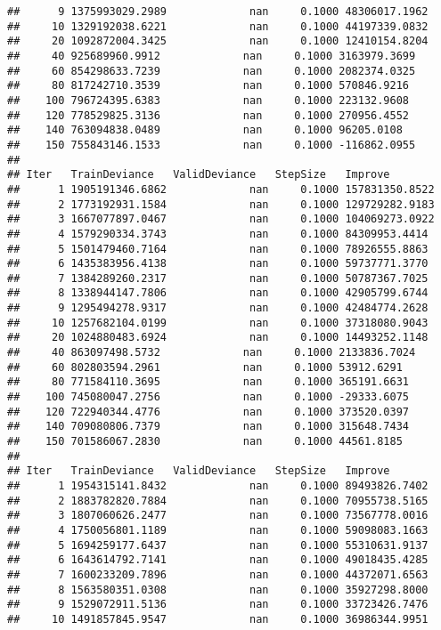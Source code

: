 \documentclass[
]{article}
\begin{document}
\begin{verbatim}
##      9 1375993029.2989             nan     0.1000 48306017.1962
##     10 1329192038.6221             nan     0.1000 44197339.0832
##     20 1092872004.3425             nan     0.1000 12410154.8204
##     40 925689960.9912             nan     0.1000 3163979.3699
##     60 854298633.7239             nan     0.1000 2082374.0325
##     80 817242710.3539             nan     0.1000 570846.9216
##    100 796724395.6383             nan     0.1000 223132.9608
##    120 778529825.3136             nan     0.1000 270956.4552
##    140 763094838.0489             nan     0.1000 96205.0108
##    150 755843146.1533             nan     0.1000 -116862.0955
## 
## Iter   TrainDeviance   ValidDeviance   StepSize   Improve
##      1 1905191346.6862             nan     0.1000 157831350.8522
##      2 1773192931.1584             nan     0.1000 129729282.9183
##      3 1667077897.0467             nan     0.1000 104069273.0922
##      4 1579290334.3743             nan     0.1000 84309953.4414
##      5 1501479460.7164             nan     0.1000 78926555.8863
##      6 1435383956.4138             nan     0.1000 59737771.3770
##      7 1384289260.2317             nan     0.1000 50787367.7025
##      8 1338944147.7806             nan     0.1000 42905799.6744
##      9 1295494278.9317             nan     0.1000 42484774.2628
##     10 1257682104.0199             nan     0.1000 37318080.9043
##     20 1024880483.6924             nan     0.1000 14493252.1148
##     40 863097498.5732             nan     0.1000 2133836.7024
##     60 802803594.2961             nan     0.1000 53912.6291
##     80 771584110.3695             nan     0.1000 365191.6631
##    100 745080047.2756             nan     0.1000 -29333.6075
##    120 722940344.4776             nan     0.1000 373520.0397
##    140 709080806.7379             nan     0.1000 315648.7434
##    150 701586067.2830             nan     0.1000 44561.8185
## 
## Iter   TrainDeviance   ValidDeviance   StepSize   Improve
##      1 1954315141.8432             nan     0.1000 89493826.7402
##      2 1883782820.7884             nan     0.1000 70955738.5165
##      3 1807060626.2477             nan     0.1000 73567778.0016
##      4 1750056801.1189             nan     0.1000 59098083.1663
##      5 1694259177.6437             nan     0.1000 55310631.9137
##      6 1643614792.7141             nan     0.1000 49018435.4285
##      7 1600233209.7896             nan     0.1000 44372071.6563
##      8 1563580351.0308             nan     0.1000 35927298.8000
##      9 1529072911.5136             nan     0.1000 33723426.7476
##     10 1491857845.9547             nan     0.1000 36986344.9951

\end{verbatim}
\end{document}
